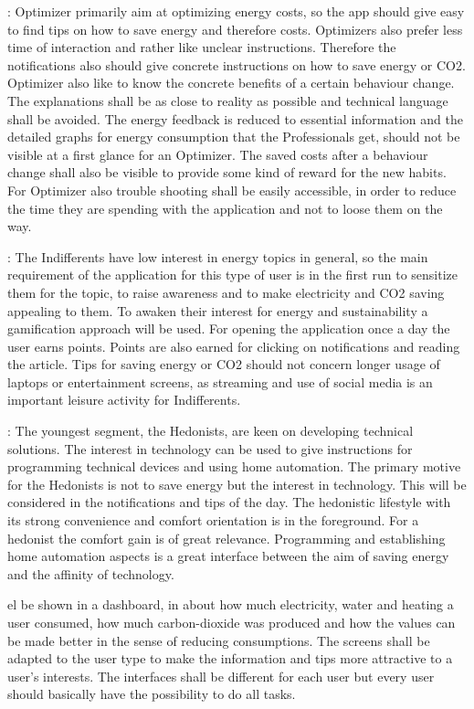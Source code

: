 : Optimizer primarily aim at optimizing energy costs, so the app should give easy to find tips on how to save energy and therefore costs. Optimizers also prefer less time of interaction and rather like unclear instructions. Therefore the notifications also should give concrete instructions on how to save energy or CO2. Optimizer also like to know the concrete benefits of a certain behaviour change. The explanations shall be as close to reality as possible and technical language shall be avoided. The energy feedback is reduced to essential information and the detailed graphs for energy consumption that the Professionals get, should not be visible at a first glance for an Optimizer. The saved costs after a behaviour change shall also be visible to provide some kind of reward for the new habits. For Optimizer also trouble shooting shall be easily accessible, in order to reduce the time they are spending with the application and not to loose them on the way.



:
The Indifferents have low interest in energy topics in general, so the main requirement of the application for this type of user is in the first run to sensitize them for the topic, to raise awareness and to make electricity and CO2 saving appealing to them. To awaken their interest for energy and sustainability a gamification approach will be used. For opening the application once a day the user earns points. Points are also earned for clicking on notifications and reading the article. Tips for saving energy or CO2 should not concern longer usage of laptops or entertainment screens, as streaming and use of social media is an important leisure activity for Indifferents.


:
The youngest segment, the Hedonists, are keen on developing technical solutions. The interest in technology can be used to give instructions for programming technical devices and using home automation. The primary motive for the Hedonists is not to save energy but the interest in technology. This will be considered in the notifications and tips of the day. The hedonistic lifestyle with its strong convenience and comfort orientation is in the foreground. For a hedonist the comfort gain is of great relevance. Programming and establishing home automation aspects is a great interface between the aim of saving energy and the affinity of technology.


el be shown in a dashboard, in about how much electricity, water and heating a user consumed, how much carbon-dioxide was produced and how the values can be made better in the sense of reducing consumptions. The screens shall be adapted to the user type to make the information and tips more attractive to a user's interests. The interfaces shall be different for each user but every user should basically have the possibility to do all tasks.

